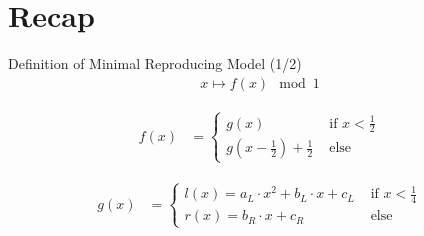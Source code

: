 \section{Recap}

\begin{frame}{Definition of Minimal Reproducing Model (1/2)}
    \vspace{-3.0em}
    \begin{align}
        x \mapsto f(x) \mod 1
    \end{align}

    \begin{align}
        f(x) & = \begin{cases}
                     g(x)                                        & \text{ if } x < \frac{1}{2} \\
                     g\left(x - \frac{1}{2}\right) + \frac{1}{2} & \text{ else}
                 \end{cases}
    \end{align}

    \begin{align}
        g(x) & = \begin{cases}
                     l(x) = a_L \cdot x^2 + b_L \cdot x + c_L & \text{ if } x < \frac{1}{4} \\
                     r(x) = b_R \cdot x + c_R                 & \text{ else}
                 \end{cases}
    \end{align}
\end{frame}

